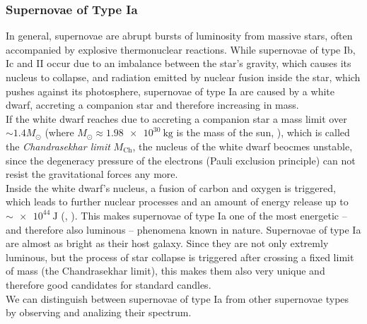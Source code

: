 \subsubsection{Supernovae of Type Ia}

In general, supernovae are abrupt bursts of luminosity from massive stars, often accompanied by explosive thermonuclear reactions.
While supernovae of type Ib, Ic and II occur due to an imbalance between the star's gravity, which causes its nucleus to collapse, and radiation emitted by nuclear fusion inside the star, which pushes against its photosphere, supernovae of type Ia are caused by a white dwarf, accreting a companion star and therefore increasing in mass. \\
If the white dwarf reaches due to accreting a companion star a mass limit over $\sim 1.4 M_{\odot}$ (where $M_{\odot} \approx \SI{1.98e+30}{\kilogram}$ is the mass of the sun, \cite[p.~48]{Bartelmann2019}), which is called the \textit{Chandrasekhar limit} $M_{\text{Ch}}$, the nucleus of the white dwarf beocmes unstable, since the degeneracy pressure of the electrons (Pauli exclusion principle) can not resist the gravitational forces any more. \\
Inside the white dwarf's nucleus, a fusion of carbon and oxygen is triggered, which leads to further nuclear processes and an amount of energy release up to $\sim \SI{e+44}{\joule}$ (\cite[p.~295]{Maguire2017}, \cite[p.~321]{Spatschek2017}).
This makes supernovae of type Ia one of the most energetic -- and therefore also luminous -- phenomena known in nature. Supernovae of type Ia are almost as bright as their host galaxy. 
Since they are not only extremly luminous, but the process of star collapse is triggered after crossing a fixed limit of mass (the Chandrasekhar limit), this makes them also very unique and therefore good candidates for standard candles. \\
\noindent We can distinguish between supernovae of type Ia from other supernovae types by observing and analizing their spectrum.

